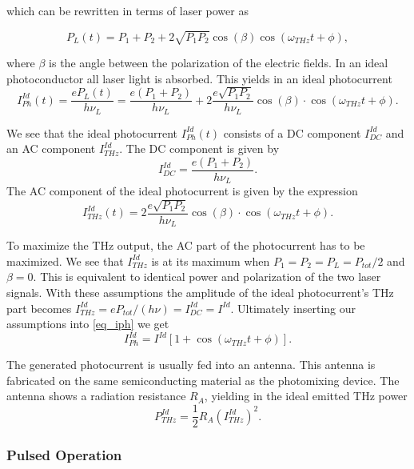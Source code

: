 which can be rewritten in terms of laser power as 

\begin{equation}
	P_L(t) = P_1 + P_2 + 2\sqrt{P_1 P_2}\cos(\beta)\cos(\omega_{THz}t + \phi), 
\end{equation}

where $\beta$ is the angle between the polarization of the electric fields. In an ideal photoconductor all laser light is absorbed. This yields in an ideal photocurrent 
\begin{equation}
	I_{Ph}^{Id}(t) = \frac{eP_L(t)}{h\nu_L} = \frac{e(P_1+P_2)}{h\nu_L} + 2\frac{e\sqrt{P_1P_2}}{h\nu_L}\cos(\beta)\cdot\cos(\omega_{THz}t + \phi).
	\label{eq_iph}
\end{equation}

We see that the ideal photocurrent $I_{Ph}^{Id}(t)$ consists of a DC component $I_{DC}^{Id}$ and an AC component $I_{THz}^{Id}$.
The DC component is given by 
\begin{equation}
	I_{DC}^{Id} = \frac{e(P_1+P_2)}{h\nu_L}.
\end{equation} 
The AC component of the ideal photocurrent is given by the expression
\begin{equation}
	I_{THz}^{Id}(t) = 2\frac{e\sqrt{P_1P_2}}{h\nu_L}\cos(\beta)\cdot\cos(\omega_{THz}t + \phi).
\end{equation}

To maximize the THz output, the AC part of the photocurrent has to be maximized. We see that $I_{THz}^{Id}$ is at its maximum when $P_1 = P_2 = P_L = P_{tot} / 2$ and $\beta = 0$. This is equivalent to identical power and polarization of the two laser signals. With these assumptions the amplitude of the ideal photocurrent's THz part becomes $I_{THz}^{Id} = eP_{tot} / (h\nu) = I_{DC}^{Id} = I^{Id}$. Ultimately inserting our assumptions into \ref{eq_iph} we get 
\begin{equation}
	I_{Ph}^{Id} = I^{Id}[1 + \cos(\omega_{THz}t + \phi)].
\end{equation}

The generated photocurrent is usually fed into an antenna. This antenna is fabricated on the same semiconducting material as the photomixing device. The antenna shows a radiation resistance $R_A$, yielding in the ideal emitted THz power 
\begin{equation}
	P_{THz}^{Id}=\frac{1}{2}R_A (I_{THz}^{Id})^2.
	\label{eq_thz_pow}
\end{equation}

\subsubsection{Pulsed Operation}

